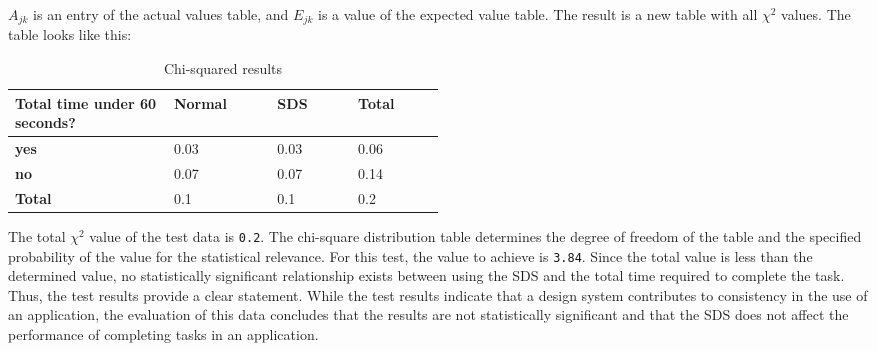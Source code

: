 $A_{jk}$ is an entry of the actual values table, and $E_{jk}$ is a value of the expected value table. The result is a new table with all $\chi^2$ values. The table looks like this:

\begin{table}[ht]
    \centering
    \begin{tabular}{|p{0.2\linewidth} || p{0.1\linewidth}|p{0.1\linewidth}|p{0.1\linewidth}|}
        \hline
        \textbf{Total time under 60 seconds?} &\textbf{Normal}&\textbf{\ac{SDS}}&\textbf{Total} \\ \hline\hline
        \textbf{yes} & 0.03 & 0.03 & 0.06 \\ \hline
        \textbf{no} & 0.07 & 0.07 & 0.14 \\ \hline
        \textbf{Total} & 0.1 & 0.1 & 0.2 \\ \hline
    \end{tabular}
    \caption{\label{tab:chi-square-results} Chi-squared results}
\end{table}
The total $\chi^2$ value of the test data is \texttt{0.2}. The chi-square distribution table determines the degree of freedom of the table and the specified probability of the value for the statistical relevance. For this test, the value to achieve is \texttt{3.84}. Since the total value is less than the determined value, no statistically significant relationship exists between using the SDS and the total time required to complete the task. \\

Thus, the test results provide a clear statement. While the test results indicate that a design system contributes to consistency in the use of an application, the evaluation of this data concludes that the results are not statistically significant and that the SDS does not affect the performance of completing tasks in an application.